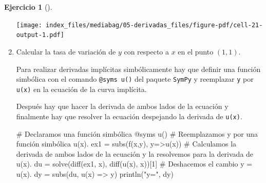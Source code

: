 \documentclass[
  a4paper,
]{scrreport}
\newenvironment{Shaded}{\begin{snugshade}}{\end{snugshade}}
\newcommand{\CommentTok}[1]{\textcolor[rgb]{0.37,0.37,0.37}{#1}}
\newcommand{\FloatTok}[1]{\textcolor[rgb]{0.68,0.00,0.00}{#1}}
\newcommand{\FunctionTok}[1]{\textcolor[rgb]{0.28,0.35,0.67}{#1}}
\newcommand{\NormalTok}[1]{\textcolor[rgb]{0.00,0.23,0.31}{#1}}
\newcommand{\OperatorTok}[1]{\textcolor[rgb]{0.37,0.37,0.37}{#1}}
\newcommand{\PreprocessorTok}[1]{\textcolor[rgb]{0.68,0.00,0.00}{#1}}
\newcommand{\StringTok}[1]{\textcolor[rgb]{0.13,0.47,0.30}{#1}}
\theoremstyle{definition}
\newtheorem{exercise}{Ejercicio}[chapter]
\theoremstyle{remark}
\begin{document}
\begin{exercise}[]
\begin{enumerate}
\begin{tcolorbox}
  \texttt{[image: index\_files/mediabag/05-derivadas\_files/figure-pdf/cell-21-output-1.pdf]}

  \end{tcolorbox}
\item
  Calcular la tasa de variación de \(y\) con respecto a \(x\) en el
  punto \((1,1)\).

  \begin{tcolorbox}[enhanced jigsaw, bottomtitle=1mm, arc=.35mm, leftrule=.75mm, left=2mm, breakable, colbacktitle=quarto-callout-note-color!10!white, toprule=.15mm, toptitle=1mm, rightrule=.15mm, opacitybacktitle=0.6, coltitle=black, title=\textcolor{quarto-callout-note-color}{\faInfo}\hspace{0.5em}{Ayuda}, colframe=quarto-callout-note-color-frame, colback=white, titlerule=0mm, bottomrule=.15mm, opacityback=0]

  Para realizar derivadas implícitas simbólicamente hay que definir una
  función simbólica con el comando \texttt{@syms\ u()} del paquete
  \texttt{SymPy} y reemplazar \texttt{y} por \texttt{u(x)} en la
  ecuación de la curva implícita.

  Después hay que hacer la derivada de ambos lados de la ecuación y
  finalmente hay que resolver la ecuación despejando la derivada de
  \texttt{u(x)}.

  \end{tcolorbox}

  \begin{tcolorbox}[enhanced jigsaw, bottomtitle=1mm, arc=.35mm, leftrule=.75mm, left=2mm, breakable, colbacktitle=quarto-callout-tip-color!10!white, toprule=.15mm, toptitle=1mm, rightrule=.15mm, opacitybacktitle=0.6, coltitle=black, title=\textcolor{quarto-callout-tip-color}{\faLightbulb}\hspace{0.5em}{Solución}, colframe=quarto-callout-tip-color-frame, colback=white, titlerule=0mm, bottomrule=.15mm, opacityback=0]

\begin{Shaded}
\begin{Highlighting}[]
\CommentTok{\# Declaramos una función simbólica}
\PreprocessorTok{@syms} \FunctionTok{u}\NormalTok{()}
\CommentTok{\# Reemplazamos y por una función simbólica u(x).}
\NormalTok{ex1 }\OperatorTok{=} \FunctionTok{subs}\NormalTok{(}\FunctionTok{f}\NormalTok{(x,y), y}\OperatorTok{=\textgreater{}}\FunctionTok{u}\NormalTok{(x))}
\CommentTok{\# Calculamos la derivada de ambos lados de la ecuación y la resolvemos para la derivada de u\textquotesingle{}(x).}
\NormalTok{du }\OperatorTok{=} \FunctionTok{solve}\NormalTok{(}\FunctionTok{diff}\NormalTok{(ex1, x), }\FunctionTok{diff}\NormalTok{(}\FunctionTok{u}\NormalTok{(x), x))[}\FloatTok{1}\NormalTok{]}
\CommentTok{\# Deshacemos el cambio y = u(x).}
\NormalTok{dy }\OperatorTok{=} \FunctionTok{subs}\NormalTok{(du, }\FunctionTok{u}\NormalTok{(x) }\OperatorTok{=\textgreater{}}\NormalTok{ y)}
\FunctionTok{println}\NormalTok{(}\StringTok{"y\textquotesingle{}="}\NormalTok{, dy)}
\end{Highlighting}
\end{Shaded}


\end{tcolorbox}
\end{enumerate}
\end{exercise}
\end{document}
